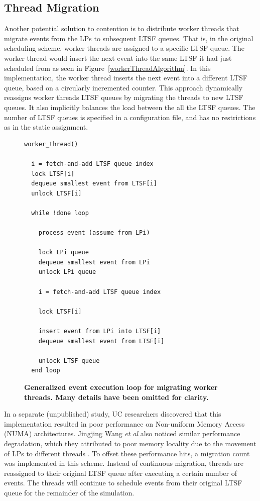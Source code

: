 \documentclass{sig-alternate}
\begin{document}
\subsection{Thread Migration}

Another potential solution to contention is to distribute worker threads that migrate
events from the LPs to subsequent LTSF queues.  That is, in the original scheduling
scheme, worker threads are assigned to a specific LTSF queue.  The worker thread would
insert the next event into the same LTSF it had just scheduled from as seen in
Figure~\ref{workerThreadAlgorithm}.  In this implementation, the worker thread inserts the
next event into a different LTSF queue, based on a circularly incremented counter.  This
approach dynamically reassigns worker threads LTSF queues by migrating the threads to new
LTSF queues.  It also implicitly balances the load between the all the LTSF queues.  The
number of LTSF queues is specified in a configuration file, and has no restrictions as in
the static assignment.

\begin{figure}
\begin{verbatim}
worker_thread()

  i = fetch-and-add LTSF queue index
  lock LTSF[i]
  dequeue smallest event from LTSF[i]
  unlock LTSF[i]

  while !done loop

    process event (assume from LPi)

    lock LPi queue
    dequeue smallest event from LPi
    unlock LPi queue

    i = fetch-and-add LTSF queue index

    lock LTSF[i]

    insert event from LPi into LTSF[i]
    dequeue smallest event from LTSF[i]

    unlock LTSF queue
  end loop
\end{verbatim}
\caption{\textbf{Generalized event execution loop for migrating worker threads.  Many
    details have been omitted for clarity.}}\label{migratinWorkerThreadAlgorithm}
\end{figure}

In a separate (unpublished) study, UC researchers discovered that this implementation
resulted in poor performance on Non-uniform Memory Access (NUMA) architectures.  Jingjing
Wang \emph{et al} also noticed similar performance degradation, which they attributed to
poor memory locality due to the movement of LPs to different threads \cite{numa}.  To
offset these performance hits, a migration count was implemented in this scheme.  Instead
of continuous migration, threads are reassigned to their original LTSF queue after
executing a certain number of events.  The threads will continue to schedule events from
their original LTSF queue for the remainder of the simulation.
\end{document}
